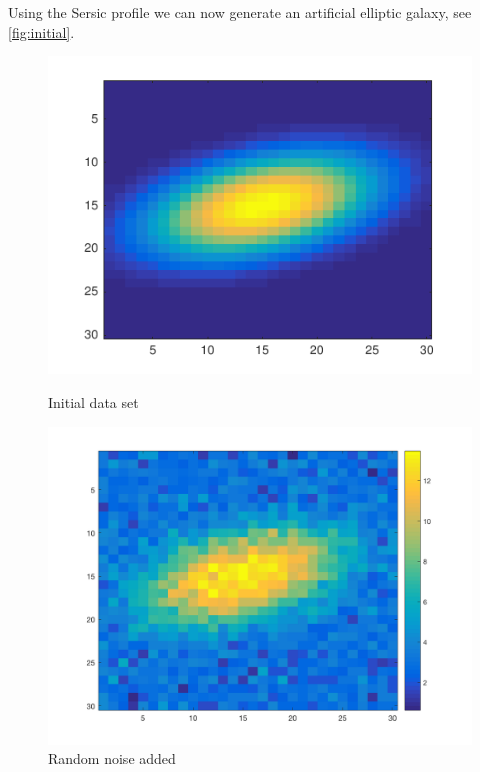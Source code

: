 Using the Sersic profile we can now generate an artificial elliptic galaxy, see \cref{fig:initial}.


\begin{figure}[!h]
	\centering
	\begin{minipage}[b]{0.4\textwidth}
		\includegraphics[width=\textwidth]{images/galaxy_initial}
		\caption{Initial data set}
		\label{fig:initial}
	\end{minipage}
	\begin{minipage}[b]{0.4\textwidth}
		\includegraphics[width=\textwidth]{images/galaxy_noise}
		\caption{Random noise added}
		\label{fig:addedNoise}
	\end{minipage}
\end{figure}

